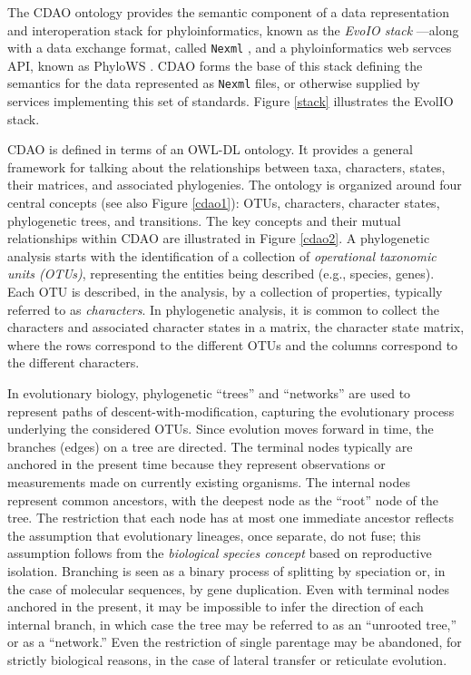 \documentclass[10pt]{bmc_article}
\newenvironment{bmcformat}{\begin{raggedright}\baselineskip20pt\sloppy\setboolean{publ}{false}}{\end{raggedright}\baselineskip20pt\sloppy}
\begin{document}
\begin{bmcformat}
  The CDAO ontology provides the semantic component of a data representation and interoperation stack for phyloinformatics, 
  known as the  \emph{EvoIO stack} \cite{evoio}---along with a data exchange format, called {\tt Nexml} \cite{nexml}, and 
  a phyloinformatics web servces API, known as PhyloWS \cite{phylows}. CDAO forms
  the base of this stack defining the semantics for the data represented as {\tt Nexml} files, or otherwise supplied by
  services implementing this set of standards. Figure \ref{stack} illustrates the EvolIO 
  stack.



  CDAO is defined in terms of an OWL-DL ontology. It provides a general framework
  for talking about the relationships between taxa, characters, states, their matrices, and associated 
  phylogenies.   The ontology is organized around four central concepts (see also
	Figure \ref{cdao1}): OTUs, characters, character states, phylogenetic trees, and
transitions. The key concepts and their mutual relationships
within CDAO are illustrated in Figure \ref{cdao2}.
A phylogenetic analysis starts with the identification of a
collection of \emph{operational taxonomic units (OTUs)}, representing
the entities being described (e.g., species, genes). Each OTU is
described, in the analysis, by a collection of properties, typically
referred to as \emph{characters}. In phylogenetic analysis,
it is common to collect the characters and associated character states in a matrix, the
character state matrix, where the rows correspond to the different
OTUs and the columns correspond to the different characters.
  
In evolutionary biology, phylogenetic ``trees'' and ``networks'' are
used to represent paths of descent-with-modification, capturing the
evolutionary process underlying the considered OTUs. Since evolution moves
forward in time, the branches (edges) on a tree are directed. The
terminal nodes typically are anchored in the present time because
they represent observations or measurements made on currently
existing organisms. The internal nodes represent common
ancestors, with the deepest node as the ``root'' node of the tree.
The restriction that each node has at most one immediate ancestor
reflects the assumption that evolutionary lineages, once separate,
do not fuse; this assumption follows from the \emph{biological species
concept} based on reproductive isolation. Branching is seen as a
binary process of splitting by speciation or, in the case of
molecular sequences, by gene duplication. 
Even with terminal nodes anchored in the present, it may be
impossible to infer the direction of each internal branch, in which
case the tree may be referred to as an ``unrooted tree,'' or as a
``network.'' Even the restriction of single parentage may be
abandoned, for strictly biological reasons, in the case of lateral
transfer or reticulate evolution. 
  

\end{bmcformat}
\end{document}
